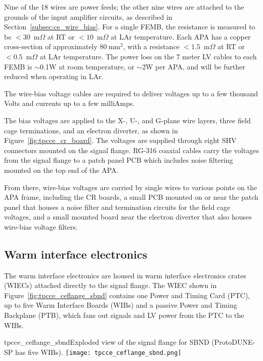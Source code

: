 Nine of the 18 wires are power feeds; the other nine wires
are attached to the grounds of the input amplifier circuits, as described in Section~\ref{subsec:ce_wire_bias}.
For a single FEMB, the resistance is measured to be $<30$~m$\Omega$ at RT or $<10$~m$\Omega$ at 
LAr temperature. Each APA has a copper cross-section of approximately $80~\mathrm{mm}^2$, with a 
resistance $<1.5$~m$\Omega$ at RT or $<0.5$~m$\Omega$ at LAr temperature. The power loss 
on the 7 meter LV cables to each FEMB is $\sim$0.1W at room temperature, or $\sim$2W per APA, and will be 
further reduced when operating in LAr.

The wire-bias voltage cables are required to deliver voltages up to a few thousand Volts and currents up to a few
milliAmps.

The bias voltages are applied to the X-, U-, and G-plane wire layers, three field cage terminations, 
and an electron diverter, as shown in Figure~\ref{fig:tpcce_cr_board}. The voltages are supplied 
through eight SHV connectors mounted on the signal flange. RG-316 coaxial cables carry the voltages 
from the signal flange to a patch panel PCB which includes noise filtering mounted on the top 
end of the APA. 

From there, wire-bias voltages are carried by single wires to 
various points on the APA frame, including the CR boards, a small PCB mounted on or near 
the patch panel that houses a noise filter and termination circuits for the field cage voltages, and 
a small mounted board near the electron diverter that also houses wire-bias voltage filters.


\subsection{Warm interface electronics}
\label{subsec:warm_interface_elec}

The warm interface electronics are housed in warm interface electronics crates (WIECs)
attached directly to the signal flange.  The WIEC shown in Figure~\ref{fig:tpcce_ceflange_sbnd} 
contains one
Power and Timing Card (PTC), up to five Warm Interface Boards (WIBs) and a passive
Power and Timing Backplane (PTB), which fans out signals and LV power from the PTC to the WIBs.

\begin{cdrfigure}{tpcce_ceflange_sbnd}{Exploded view of 
the signal flange for SBND (ProtoDUNE-SP has five WIBs).}
\texttt{[image: tpcce\_ceflange\_sbnd.png]}
\end{cdrfigure}

